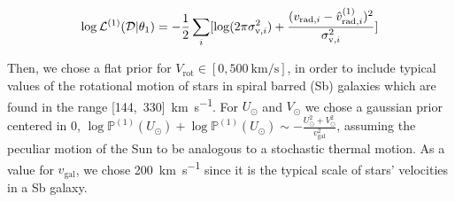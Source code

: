 \begin{equation}\label{Eq:LogLikeMod1}
    \log \mathcal{L}^{(1)}(\mathcal{D} \vert \theta_1) = -\frac{1}{2}\sum_i[\log(2\pi\sigma_{\text{v},i}^2)+\frac{(v_{\text{rad},i} - \hat{v}_{\text{rad},i}^{(1)})^2}{\sigma_{\text{v},i}^2}]
\end{equation}

Then, we chose a flat prior for $V_{\text{rot}}\in[0,\qty{500}{\kilo\meter\per\second}]$, 
in order to include typical values of the rotational motion of stars in spiral barred (Sb) galaxies which are found in the range [144,~330]~\unit{\kilo\meter\per\second}\cite{Schneider2015}. 
For $U_\odot$ and $V_\odot$ we chose a gaussian prior centered in 0, $\log\mathbb{P}^{(1)}(U_\odot) + \log\mathbb{P}^{(1)}(U_\odot) \sim - \frac{U_\odot^2 + V_{\odot}^2}{v_{\text{gal}}^2}$, assuming the peculiar motion of the Sun to be analogous to a stochastic thermal motion. 
As a value for $v_{\text{gal}}$, we chose 200~\unit{\kilo\meter\per\second} since it is the typical scale of stars' velocities in a Sb galaxy.


